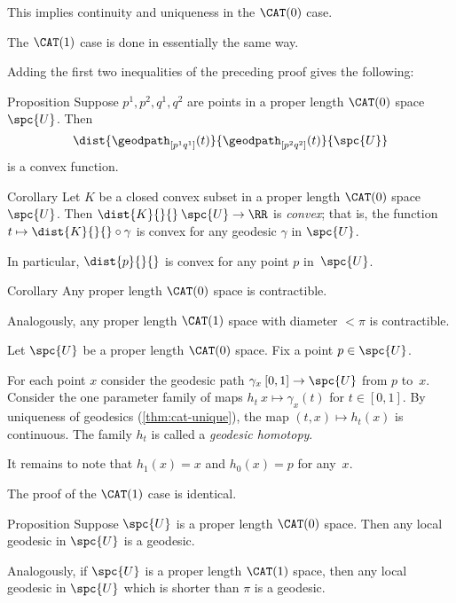 This implies continuity and uniqueness in the $\CAT(0)$ case.  
 
The $\CAT(1)$ case is done in essentially the same way.
\qeds

Adding the first two inequalities of the preceding proof gives the following:

\begin{thm}{Proposition}
Suppose $p^1,p^2,q^1,q^2$ are points in a proper length $\CAT(0)$ space~$\spc{U}$.
Then 
\[\dist{\geodpath_{[p^1q^1]}(t)}{\geodpath_{[p^2q^2]}(t)}{\spc{U}}\]
is a convex function.
\end{thm}

\begin{thm}{Corollary}\label{cor:dist-convex}
Let $K$ be a closed convex subset in a proper length $\CAT(0)$ space~$\spc{U}$.
Then $\dist{K}{}{}\:\spc{U}\to\RR$ is \emph{convex};
that is, the function $t\mapsto\dist{K}{}{}\circ\gamma$ is convex for any geodesic $\gamma$ in $\spc{U}$.

In particular, $\dist{p}{}{}$ is convex for any point $p$ in~$\spc{U}$.
\end{thm}


\begin{thm}{Corollary}\label{cor:contractible-cat}
Any proper length $\CAT(0)$ space is contractible.

Analogously, any proper length $\CAT(1)$ space with diameter $<\pi$ is contractible.
\end{thm}

 Let $\spc{U}$ be a proper length $\CAT(0)$ space.
Fix a point $p\in \spc{U}$.

For each point $x$ consider the geodesic path $\gamma_x\:[0,1]\to \spc{U}$ from $p$ to~$x$.
Consider the one parameter family of maps 
$h_t\:x\mapsto \gamma_x(t)$ for $t\in [0,1]$.
By uniqueness of geodesics (\ref{thm:cat-unique}), the map 
$(t,x)\mapsto h_t(x)$ is continuous. The family $h_t$ is called a \emph{geodesic homotopy}.

It remains to note that $h_1(x)=x$ and $h_0(x)=p$ for any~$x$.

The proof of the $\CAT(1)$ case is identical.
\qeds

\begin{thm}{Proposition}\label{cor:loc-geod-are-min}
Suppose $\spc{U}$ is a proper length $\CAT(0)$ space.  
Then any local geodesic in $\spc{U}$ is a geodesic.

Analogously, if $\spc{U}$ is a proper length $\CAT(1)$ space, then any local geodesic in $\spc{U}$ which is shorter than $\pi$ is a geodesic.
\end{thm}

